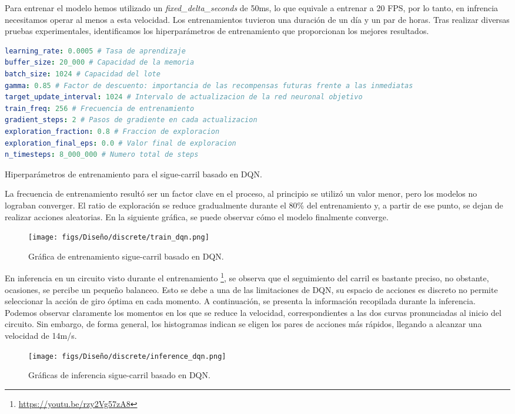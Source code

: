 Para entrenar el modelo hemos utilizado un \textit{fixed\_delta\_seconds} de 50ms, lo que equivale a entrenar a 20 \ac{FPS}, por lo tanto, en infrencia necesitamos operar al menos a esta velocidad. Los entrenamientos tuvieron una duración de un día y un par de horas. Tras realizar diversas pruebas experimentales, identificamos los hiperparámetros de entrenamiento que proporcionan los mejores resultados. 
\begin{code}[h]
\begin{lstlisting}[language=yaml]
learning_rate: 0.0005 # Tasa de aprendizaje
buffer_size: 20_000 # Capacidad de la memoria
batch_size: 1024 # Capacidad del lote
gamma: 0.85 # Factor de descuento: importancia de las recompensas futuras frente a las inmediatas
target_update_interval: 1024 # Intervalo de actualizacion de la red neuronal objetivo
train_freq: 256 # Frecuencia de entrenamiento
gradient_steps: 2 # Pasos de gradiente en cada actualizacion
exploration_fraction: 0.8 # Fraccion de exploracion
exploration_final_eps: 0.0 # Valor final de exploracion
n_timesteps: 8_000_000 # Numero total de steps

\end{lstlisting}
\caption[Hiperparámetros de entrenamiento para el sigue-carril basado en \ac{DQN}]{Hiperparámetros de entrenamiento para el sigue-carril basado en \ac{DQN}.}
\label{cod:hiper_params_dqn}
\end{code}

La frecuencia de entrenamiento resultó ser un factor clave en el proceso, al principio se utilizó un valor menor, pero los modelos no lograban converger. El ratio de exploración se reduce gradualmente durante el 80\% del entrenamiento y, a partir de ese punto, se dejan de realizar acciones aleatorias. En la siguiente gráfica, se puede observar cómo el modelo finalmente converge.
\begin{figure}[ht]
  \centering
  \texttt{[image: figs/Diseño/discrete/train\_dqn.png]}
  \caption{Gráfica de entrenamiento sigue-carril basado en \ac{DQN}.}
  \label{fig:train_dqn}
\end{figure}

\newpage

En inferencia en un circuito visto durante el entrenamiento \footnote{\url{https://youtu.be/rzy2Vg57zA8}}, se observa que el seguimiento del carril es bastante preciso, no obstante, ocasiones, se percibe un pequeño balanceo. Esto se debe a una de las limitaciones de \ac{DQN}, su espacio de acciones es discreto no permite seleccionar la acción de giro óptima en cada momento. A continuación, se presenta la información recopilada durante la inferencia. Podemos observar claramente los momentos en los que se reduce la velocidad, correspondientes a las dos curvas pronunciadas al inicio del circuito. Sin embargo, de forma general, los histogramas indican se eligen los pares de acciones más rápidos, llegando a alcanzar una velocidad de 14m/s.
\begin{figure}[ht]
  \centering
  \texttt{[image: figs/Diseño/discrete/inference\_dqn.png]}
  \caption{Gráficas de inferencia sigue-carril basado en \ac{DQN}.}
  \label{fig:inference_dqn}
\end{figure}

